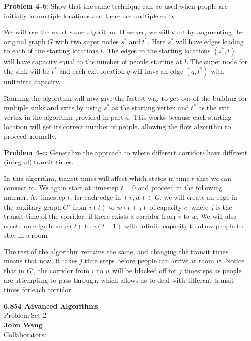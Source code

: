 \documentclass[psamsfonts]{amsart}
\newenvironment{sol}{\vspace{0.25cm}{\large \bfseries Solution:}}{\qedsymbol}
\newenvironment{prob}[1]{\begin{framed}{\large \bfseries Problem #1:}}{\end{framed}}
\newcommand{\makenewtitle}{
    \begin{center}
    {\huge \bfseries 6.854 Advanced Algorithms} \\
    Problem Set 2\\
    \vspace{0.25cm}
    {\bfseries John Wang} \\
    Collaborators:
    \end{center}
    \vspace{0.5cm}
}
\begin{document}
\begin{prob}{4-b}
Show that the same technique can be used when people are initially in multiple locations and there are multiple exits.
\end{prob}
\begin{sol}
We will use the exact same algorithm. However, we will start by augmenting the original graph $G$ with two super nodes $s^*$ and $t^*$. Here $s^*$ will have edges leading to each of the starting locations $l$. The edges to the starting locations $(s^*, l)$ will have capacity equal to the number of people starting at $l$. The super node for the sink will be $t^*$ and each exit location $q$ will have an edge $(q, t^*)$ with unlimited capacity.

Running the algorithm will now give the fastest way to get out of the building for multiple sinks and exits by using $s^*$ as the starting vertex and $t^*$ as the exit vertex in the algorithm provided in part $a$. This works because each starting location will get its correct number of people, allowing the flow algorithm to proceed normally.
\end{sol}

\begin{prob}{4-c}
Generalize the approach to where different corridors have different (integral) transit times.
\end{prob}
\begin{sol}
In this algorithm, transit times will affect which states in time $t$ that we can connect to. We again start at timestep $t=0$ and proceed in the following manner. At timestep $t$, for each edge in $(v,w) \in G$, we will create an edge in the auxiliary graph $G'$ from $v(t)$ to $w(t+j)$ of capacity $c$, where $j$ is the transit time of the corridor, if there exists a corridor from $v$ to $w$. We will also create an edge from $v(t)$ to $v(t+1)$ with infinite capacity to allow people to stay in a room.

The rest of the algorithm remains the same, and changing the transit times means that now, it takes $j$ time steps before people can arrive at room $w$. Notice that in $G'$, the corridor from $v$ to $w$ will be blocked off for $j$ timesteps as people are attempting to pass through, which allows us to deal with different transit times for each corridor. 
\end{sol}

\newpage
\makenewtitle
\end{document}
